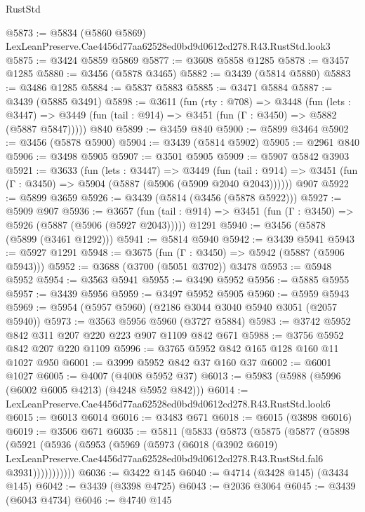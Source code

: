 \begin{lexlean}{RustStd}
\begin{coremodule}
@5873 := @5834 (@5860 @5869) LexLeanPreserve.Cae4456d77aa62528ed0bd9d0612cd278.R43.RustStd.look3
@5875 := @3424 @5859 @5869
@5877 := @3608 @5858 @1285
@5878 := @3457 @1285
@5880 := @3456 (@5878 @3465)
@5882 := @3439 (@5814 @5880)
@5883 := @3486 @1285
@5884 := @5837 @5883
@5885 := @3471 @5884
@5887 := @3439 (@5885 @3491)
@5898 := @3611
    (fun (rty : @708) =>
    @3448
      (fun (lets : @3447) =>
      @3449 (fun (tail : @914) => @3451 (fun (Γ : @3450) => @5882 (@5887 @5847)))))
    @840
@5899 := @3459 @840
@5900 := @5899 @3464
@5902 := @3456 (@5878 @5900)
@5904 := @3439 (@5814 @5902)
@5905 := @2961 @840
@5906 := @3498 @5905
@5907 := @3501 @5905
@5909 := @5907 @5842 @3903
@5921 := @3633
    (fun (lets : @3447) =>
    @3449
      (fun (tail : @914) => @3451 (fun (Γ : @3450) => @5904 (@5887 (@5906 (@5909 @2040 @2043))))))
    @907
@5922 := @5899 @3659
@5926 := @3439 (@5814 (@3456 (@5878 @5922)))
@5927 := @5909 @907
@5936 := @3657
    (fun (tail : @914) => @3451 (fun (Γ : @3450) => @5926 (@5887 (@5906 (@5927 @2043)))))
    @1291
@5940 := @3456 (@5878 (@5899 (@3461 @1292)))
@5941 := @5814 @5940
@5942 := @3439 @5941
@5943 := @5927 @1291
@5948 := @3675 (fun (Γ : @3450) => @5942 (@5887 (@5906 @5943)))
@5952 := @3688 (@3700 (@5051 @3702)) @3478
@5953 := @5948 @5952
@5954 := @3563 @5941
@5955 := @3490 @5952
@5956 := @5885 @5955
@5957 := @3439 @5956
@5959 := @3497 @5952 @5905
@5960 := @5959 @5943
@5969 := @5954 (@5957 @5960) (@2186 @3044 @3040 @5940 @3051 (@2057 @5940))
@5973 := @3563 @5956 @5960 (@3727 @5884)
@5983 := @3742 @5952 @842 @311 @207 @220 @223 @907 @1109 @842 @671
@5988 := @3756 @5952 @842 @207 @220 @1109
@5996 := @3765 @5952 @842 @165 @128 @160 @11 @1027 @950
@6001 := @3999 @5952 @842 @37 @160 @37
@6002 := @6001 @1027
@6005 := @4007 (@4008 @5952 @37)
@6013 := @5983 (@5988 (@5996 (@6002 @6005 @4213) (@4248 @5952 @842)))
@6014 := LexLeanPreserve.Cae4456d77aa62528ed0bd9d0612cd278.R43.RustStd.look6
@6015 := @6013 @6014
@6016 := @3483 @671
@6018 := @6015 (@3898 @6016)
@6019 := @3506 @671
@6035 := @5811
    (@5833
      (@5873
        (@5875
          (@5877
            (@5898
              (@5921
                (@5936
                  (@5953
                    (@5969
                      (@5973
                        (@6018
                          (@3902 @6019)
                          LexLeanPreserve.Cae4456d77aa62528ed0bd9d0612cd278.R43.RustStd.fal6
                          @3931)))))))))))
@6036 := @3422 @145
@6040 := @4714 (@3428 @145) (@3434 @145)
@6042 := @3439 (@3398 @4725)
@6043 := @2036 @3064
@6045 := @3439 (@6043 @4734)
@6046 := @4740 @145

\end{coremodule}
\end{lexlean}
